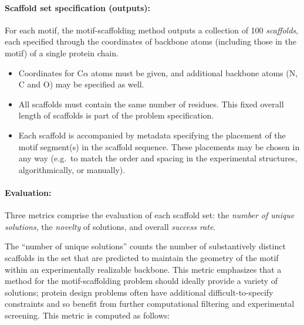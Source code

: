 \paragraph{Scaffold set specification (outputs):}
For each motif, the motif-scaffolding method outputs a collection of 100 \emph{scaffolds}, each specified through the coordinates of backbone atoms (including those in the motif) of a single protein chain.
\begin{itemize}
\item{Coordinates for C$\alpha$ atoms must be given, and additional backbone atoms (N, C and O) may be specified as well.}
\item{All scaffolds must contain the same number of residues.  This fixed overall length of scaffolds is part of the problem specification.}
\item{Each scaffold is accompanied by metadata specifying the placement of the motif segment(s) in the scaffold sequence.
These placements may be chosen in any way (e.g.\ to match the order and spacing in the experimental structures, algorithmically, or manually).}
\end{itemize}


\paragraph{Evaluation:}

Three metrics comprise the evaluation of each scaffold set: the \emph{number of unique solutions}, the \emph{novelty} of solutions, and overall \emph{success rate}.

The ``number of unique solutions'' counts the number of substantively distinct scaffolds in the set that are predicted to maintain the geometry of the motif within an experimentally realizable backbone.
This metric emphasizes that a method for the motif-scaffolding problem should ideally provide a variety of solutions;
protein design problems often have additional difficult-to-specify constraints and so benefit from further computational filtering and experimental screening.
This metric is computed as follows:

